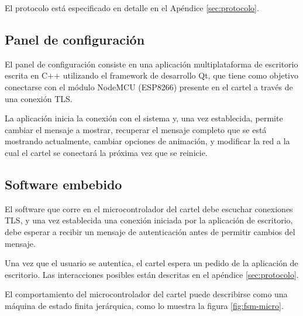 El protocolo está especificado en detalle en el Apéndice \ref{sec:protocolo}.


\subsection{Panel de configuración}
El panel de configuración consiste en una aplicación multiplataforma de escritorio escrita en C++ utilizando el framework de desarrollo Qt, que tiene como objetivo conectarse con el módulo NodeMCU (ESP8266) presente en el cartel a través de una conexión TLS.

La aplicación inicia la conexión con el sistema y, una vez establecida, permite cambiar el mensaje a mostrar, recuperar el mensaje completo que se está mostrando actualmente, cambiar opciones de animación, y modificar la red a la cual el cartel se conectará la próxima vez que se reinicie.

\subsection{Software embebido}
El software que corre en el microcontrolador del cartel debe escuchar conexiones TLS, y una vez establecida una conexión iniciada por la aplicación de escritorio, debe esperar a recibir un mensaje de autenticación antes de permitir cambios del mensaje.

Una vez que el usuario se autentica, el cartel espera un pedido de la aplicación de escritorio. Las interacciones posibles están descritas en el apéndice \ref{sec:protocolo}.

El comportamiento del microcontrolador del cartel puede describirse como una máquina de estado finita jerárquica, como lo muestra la figura \ref{fig:fsm-micro}.

